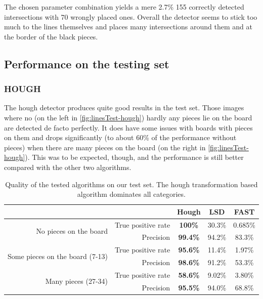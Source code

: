 	The chosen parameter combination yields a mere 2.7\% 155 correctly detected intersections with 70 wrongly placed ones. Overall the detector seems to stick too much to the lines themselves and places many intersections around them and at the border of the black pieces. %

	\subsection{Performance on the testing set}
	\label{evaluation-visible-performance}
	\subsubsection{HOUGH}
	\label{evaluation-visible-performance-hough}
	The hough detector produces quite good results in the test set. Those images where no (on the left in \autoref{fig:linesTest-hough}) hardly any pieces lie on the board are detected de facto perfectly. It does have some issues with boards with pieces on them and drops significantly (to about 60\% of the performance without pieces) when there are many pieces on the board (on the right in \autoref{fig:linesTest-hough}). This was to be expected, though, and the performance is still better compared with the other two algorithms.

	\begin{table}[b]
		\begin{tabular}{|r|r||>{\bfseries}c|c|c|}
			\cline{3-5}
		    \multicolumn{2}{c|}{}											 		& Hough 	& LSD 		& FAST     \\
			\cline{3-5}
			\hline
			\multirow{2}{*}{No pieces on the board}   		& True positive rate 	& 100\% 	& 30.3\%  	& 0.685\%  \\
															& Precision			 	& 99.4\% 	& 94.2\%  	& 83.3\%  \\
			\hline
			\multirow{2}{*}{Some pieces on the board (7-13)}& True positive rate 	& 95.6\% 	& 11.4\% 	& 1.97\%   \\
															& Precision 			& 98.6\% 	& 91.2\%  	& 53.3\%  \\
			\hline
			\multirow{2}{*}{Many pieces (27-34)} 			& True positive rate 	& 58.6\% 	& 9.02\% 	& 3.80\%   \\
															& Precision			 	& 95.5\% 	& 94.0\%  	& 68.8\%  \\
			\hline
		\end{tabular}
		\caption{Quality of the tested algorithms on our test set. The hough transformation based algorithm dominates all categories.}
		\label{tab:linesTest}
	\end{table}

